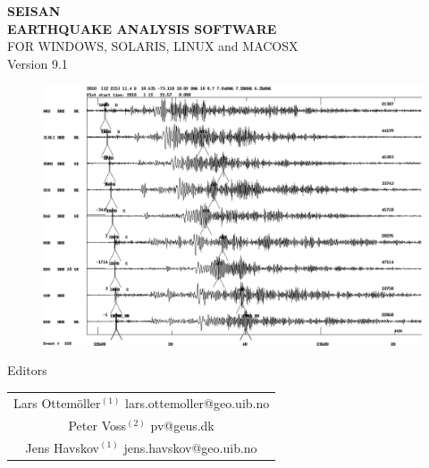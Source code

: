 %
%
\begin{titlepage}
\begin{center}
{\huge \bf{SEISAN}}\\[.5cm]
{\huge \bf{EARTHQUAKE ANALYSIS SOFTWARE}} \\[.5cm]
{\large FOR WINDOWS, SOLARIS, LINUX and MACOSX} \\[.5cm]
{\small Version 9.1}\\

\begin{figure}[h]
\centering
\includegraphics[width=16cm]{fig/haiti2010}\\
\end{figure}

Editors


\begin{tabular}{c}
Lars Ottem\"oller$^{(1)}$ lars.ottemoller@geo.uib.no \\
Peter Voss$^{(2)}$ pv@geus.dk \\
Jens Havskov$^{(1)}$ jens.havskov@geo.uib.no \\
\end{tabular}


\end{center}
\end{titlepage}
